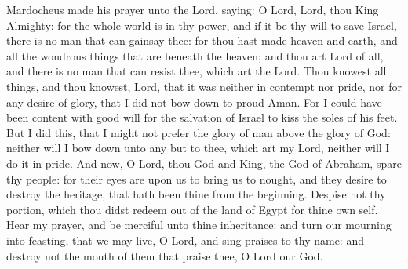 Mardocheus made his prayer unto the Lord, saying: O Lord, Lord, thou King Almighty: for the whole world is in thy power, and if it be thy will to save Israel, there is no man that can gainsay thee: for thou hast made heaven and earth, and all the wondrous things that are beneath the heaven; and thou art Lord of all, and there is no man that can resist thee, which art the Lord. Thou knowest all things, and thou knowest, Lord, that it was neither in contempt nor pride, nor for any desire of glory, that I did not bow down to proud Aman. For I could have been content with good will for the salvation of Israel to kiss the soles of his feet. But I did this, that I might not prefer the glory of man above the glory of God: neither will I bow down unto any but to thee, which art my Lord, neither will I do it in pride. And now, O Lord, thou God and King, the God of Abraham, spare thy people: for their eyes are upon us to bring us to nought, and they desire to destroy the heritage, that hath been thine from the beginning. Despise not thy portion, which thou didst redeem out of the land of Egypt for thine own self. Hear my prayer, and be merciful unto thine inheritance: and turn our mourning into feasting, that we may live, O Lord, and sing praises to thy name: and destroy not the mouth of them that praise thee, O Lord our God.


